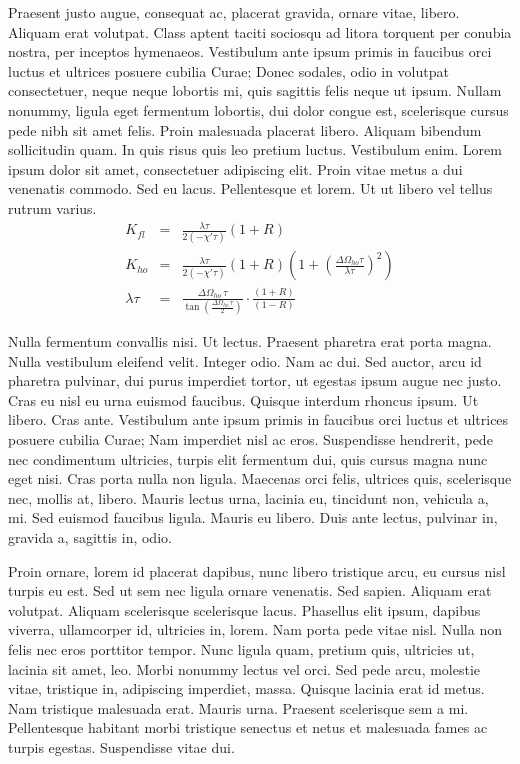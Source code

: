 \documentclass[nochapterpage,bigchapter,linedtoc,longdoc,colorback,accentcolor=tud4c]{tudreport}
\begin{document}
    Praesent justo augue, consequat ac, placerat gravida, ornare vitae, libero. Aliquam erat volutpat. Class aptent taciti sociosqu ad litora torquent per conubia nostra, per inceptos hymenaeos. Vestibulum ante ipsum primis in faucibus orci luctus et ultrices posuere cubilia Curae; Donec sodales, odio in volutpat consectetuer, neque neque lobortis mi, quis sagittis felis neque ut ipsum. Nullam nonummy, ligula eget fermentum lobortis, dui dolor congue est, scelerisque cursus pede nibh sit amet felis. Proin malesuada placerat libero. Aliquam bibendum sollicitudin quam. In quis risus quis leo pretium luctus. Vestibulum enim. Lorem ipsum dolor sit amet, consectetuer adipiscing elit. Proin vitae metus a dui venenatis commodo. Sed eu lacus. Pellentesque et lorem. Ut ut libero vel tellus rutrum varius.
			\begin{eqnarray}
				K_{fl}&=&\frac{\lambda\tau}{2(-\chi'\tau)}(1+R)\\
				K_{ho}&=&\frac{\lambda\tau}{2(-\chi'\tau)}(1+R)
					\left(1+\left(\frac{\Delta\Omega_{ho}\tau}{\lambda\tau}\right)^2\right)
					\\
				\lambda\tau&=&
					\frac{\Delta\Omega_{ho}\,\tau}{\tan\left(\frac{\Delta\Omega_{ho}\,\tau}{2}
					\right)}\cdot\frac{(1+R)}{(1-R)}
			\end{eqnarray}

    Nulla fermentum convallis nisi. Ut lectus. Praesent pharetra erat porta magna. Nulla vestibulum eleifend velit. Integer odio. Nam ac dui. Sed auctor, arcu id pharetra pulvinar, dui purus imperdiet tortor, ut egestas ipsum augue nec justo. Cras eu nisl eu urna euismod faucibus. Quisque interdum rhoncus ipsum. Ut libero. Cras ante. Vestibulum ante ipsum primis in faucibus orci luctus et ultrices posuere cubilia Curae; Nam imperdiet nisl ac eros. Suspendisse hendrerit, pede nec condimentum ultricies, turpis elit fermentum dui, quis cursus magna nunc eget nisi. Cras porta nulla non ligula. Maecenas orci felis, ultrices quis, scelerisque nec, mollis at, libero. Mauris lectus urna, lacinia eu, tincidunt non, vehicula a, mi. Sed euismod faucibus ligula. Mauris eu libero. Duis ante lectus, pulvinar in, gravida a, sagittis in, odio.

    Proin ornare, lorem id placerat dapibus, nunc libero tristique arcu, eu cursus nisl turpis eu est. Sed ut sem nec ligula ornare venenatis. Sed sapien. Aliquam erat volutpat. Aliquam scelerisque scelerisque lacus. Phasellus elit ipsum, dapibus viverra, ullamcorper id, ultricies in, lorem. Nam porta pede vitae nisl. Nulla non felis nec eros porttitor tempor. Nunc ligula quam, pretium quis, ultricies ut, lacinia sit amet, leo. Morbi nonummy lectus vel orci. Sed pede arcu, molestie vitae, tristique in, adipiscing imperdiet, massa. Quisque lacinia erat id metus. Nam tristique malesuada erat. Mauris urna. Praesent scelerisque sem a mi. Pellentesque habitant morbi tristique senectus et netus et malesuada fames ac turpis egestas. Suspendisse vitae dui.
\end{document}

